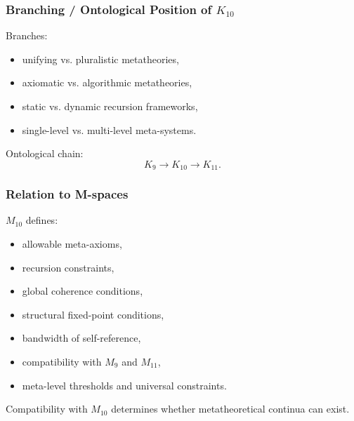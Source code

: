\subsubsection{Branching / Ontological Position of $K_{10}$}

Branches:
\begin{itemize}
    \item unifying vs. pluralistic metatheories,
    \item axiomatic vs. algorithmic metatheories,
    \item static vs. dynamic recursion frameworks,
    \item single-level vs. multi-level meta-systems.
\end{itemize}

Ontological chain:
\[
K_9 \to K_{10} \to K_{11}.
\]

\subsubsection{Relation to M-spaces}

$M_{10}$ defines:
\begin{itemize}
    \item allowable meta-axioms,
    \item recursion constraints,
    \item global coherence conditions,
    \item structural fixed-point conditions,
    \item bandwidth of self-reference,
    \item compatibility with $M_9$ and $M_{11}$,
    \item meta-level thresholds and universal constraints.
\end{itemize}

Compatibility with $M_{10}$ determines whether metatheoretical continua can exist.
